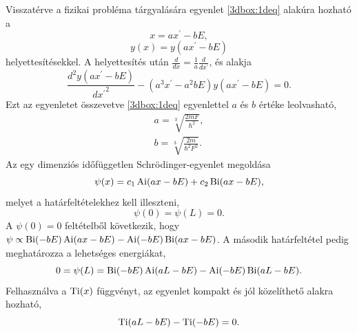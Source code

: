 Visszatérve a fizikai probléma tárgyalására  egyenlet \eqref{3dbox:1deq} alakúra hozható a
\begin{equation}
	x = ax^\prime - bE,
\end{equation}
\begin{equation}
	y(x) = y(ax^\prime - bE)
\end{equation}
helyettesítésekkel. A helyettesítés után $\frac{d}{dx} = \frac{1}{a}\frac{d}{dx^\prime}$, és  alakja
\begin{equation}
	\frac{d^2y(ax^\prime-bE)}{{dx^\prime}^2} - \left(a^3x^\prime - a^2bE\right)y(ax^\prime-bE) = 0.
\end{equation}
Ezt az egyenletet összevetve \eqref{3dbox:1deq} egyenlettel $a$ és $b$ értéke leolvasható,
\begin{equation}
	\begin{aligned}
		a = \sqrt[3]{\frac{2mF}{\hbar^2}},\\
		b = \sqrt[3]{\frac{2m}{\hbar^2F^2}}.
	\end{aligned}
\end{equation}
Az egy dimenziós időfüggetlen Schrödinger-egyenlet megoldása
\begin{equation}
	\psi(x) = c_1\operatorname{Ai}(ax-bE)+c_2\operatorname{Bi}(ax-bE),
\end{equation}
melyet a határfeltételekhez kell illeszteni,
\begin{equation}
	\psi(0) = \psi(L) = 0.
\end{equation}
A $\psi(0) = 0$ feltételből következik, hogy $\psi \propto \operatorname{Bi}(-bE)\operatorname{Ai}(ax-bE) - \operatorname{Ai}(-bE)\operatorname{Bi}(ax-bE)$. A második határfeltétel pedig meghatározza a lehetséges energiákat,
\begin{equation}
		0 = \psi(L) = \operatorname{Bi}(-bE)\operatorname{Ai}(aL-bE) - \operatorname{Ai}(-bE)\operatorname{Bi}(aL-bE).
		\label{vegesf:aibilevels}
\end{equation}
Felhasználva a $\operatorname{Ti}(x)$ függvényt, az egyenlet kompakt és jól közelíthető alakra hozható,
\begin{equation}
	\label{box_energiaszintek_egyenlet}
	\operatorname{Ti}(aL-bE) - \operatorname{Ti}(-bE) = 0.
\end{equation}
